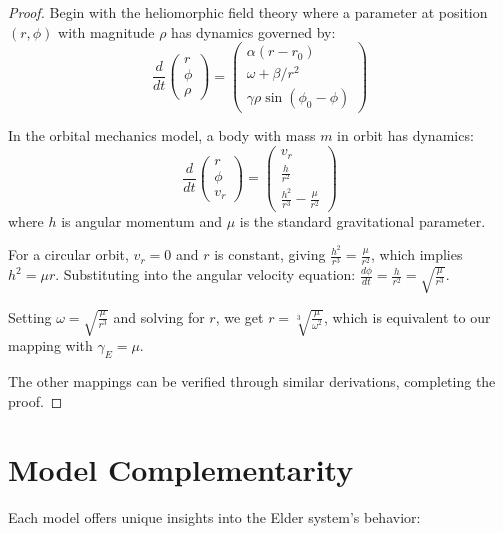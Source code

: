 \begin{proof}
Begin with the heliomorphic field theory where a parameter at position $(r,\phi)$ with magnitude $\rho$ has dynamics governed by:
\begin{equation}
    \frac{d}{dt}\begin{pmatrix} r \\ \phi \\ \rho \end{pmatrix} = \begin{pmatrix} 
    \alpha(r-r_0) \\ 
    \omega + \beta/r^2 \\ 
    \gamma\rho\sin(\phi_0 - \phi) 
    \end{pmatrix}
\end{equation}

In the orbital mechanics model, a body with mass $m$ in orbit has dynamics:
\begin{equation}
    \frac{d}{dt}\begin{pmatrix} r \\ \phi \\ v_r \end{pmatrix} = \begin{pmatrix} 
    v_r \\ 
    \frac{h}{r^2} \\ 
    \frac{h^2}{r^3} - \frac{\mu}{r^2} 
    \end{pmatrix}
\end{equation}
where $h$ is angular momentum and $\mu$ is the standard gravitational parameter.

For a circular orbit, $v_r = 0$ and $r$ is constant, giving $\frac{h^2}{r^3} = \frac{\mu}{r^2}$, which implies $h^2 = \mu r$. Substituting into the angular velocity equation: $\frac{d\phi}{dt} = \frac{h}{r^2} = \sqrt{\frac{\mu}{r^3}}$.

Setting $\omega = \sqrt{\frac{\mu}{r^3}}$ and solving for $r$, we get $r = \sqrt[3]{\frac{\mu}{\omega^2}}$, which is equivalent to our mapping with $\gamma_E = \mu$.

The other mappings can be verified through similar derivations, completing the proof.
\end{proof}

\section{Model Complementarity}

Each model offers unique insights into the Elder system's behavior:

